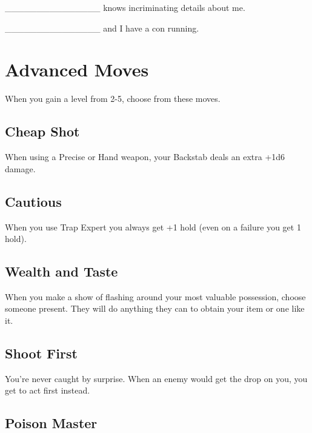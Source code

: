  

\_\_\_\_\_\_\_\_\_\_\_\_\_\_\_ knows incriminating details about me.

 

\_\_\_\_\_\_\_\_\_\_\_\_\_\_\_ and I have a con running.



 
\section{Advanced Moves}    
 


\startInstructionsAfterHeader
When you gain a level from 2-5, choose from these moves.
\stopInstructionsAfterHeader
 
\subsection{Cheap Shot}    
 

When using a Precise or Hand weapon, your Backstab deals an extra +1d6 damage.

 
\subsection{Cautious}   
 

When you use Trap Expert you always get +1 hold (even on a failure you get 1 hold).

 
\subsection{Wealth and Taste}    
 

When you make a show of flashing around your most valuable possession, choose someone present. They will do anything they can to obtain your item or one like it.

 
\subsection{Shoot First}   
 

You're never caught by surprise. When an enemy would get the drop on you, you get to act first instead.

 
\subsection{Poison Master}    
 

